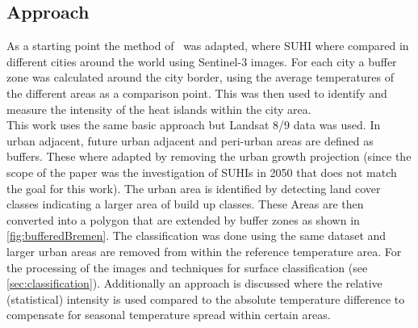 \documentclass[12pt,a4paper, english,twoside]{scrartcl}
\begin{document}
    \subsection{Approach}
      As a starting point the method of~\cite{Sobrino2020} was adapted, where \gls{SUHI} where compared in different cities around the world using Sentinel-3 images. 
      For each city a buffer zone was calculated around the city border, using the average temperatures of the different areas as a comparison point.
      This was then used to identify and measure the intensity of the heat islands within the city area.\\ 
      This work uses the same basic approach but Landsat 8/9 data was used. 
      In~\cite{Sobrino2020} urban adjacent, future urban adjacent and peri-urban areas are defined as buffers.
      These where adapted by removing the urban growth projection (since the scope of the paper was the investigation of \glspl{SUHI} in 2050 that does not match the goal for this work).
      The urban area is identified by detecting land cover classes indicating a larger area of build up classes. 
      These Areas are then converted into a polygon that are extended by buffer zones as shown in \cref{fig:bufferedBremen}.
      The classification was done using the same dataset and larger urban areas are removed from within the reference temperature area. For the processing of the images and techniques for surface classification (see \cref{sec:classification}). 
      Additionally an approach is discussed where the relative (statistical) intensity is used compared to the absolute temperature difference to compensate for seasonal temperature spread within certain areas.
      \newpage
\end{document}
